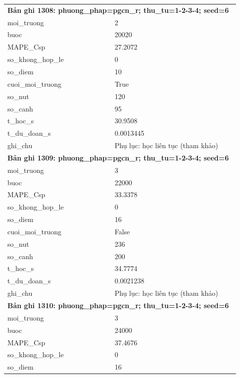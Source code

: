 \begin{longtable}{p{0.43\linewidth}p{0.50\linewidth}}
\midrule
\multicolumn{2}{p{0.95\linewidth}}{\textbf{Bản ghi 1308: phuong\_phap=pgcn\_r; thu\_tu=1-2-3-4; seed=6}} \\
moi\_\allowbreak truong & 2 \\
buoc & 20020 \\
MAPE\_\allowbreak Csp & 27.2072 \\
so\_\allowbreak khong\_\allowbreak hop\_\allowbreak le & 0 \\
so\_\allowbreak diem & 10 \\
cuoi\_\allowbreak moi\_\allowbreak truong & True \\
so\_\allowbreak nut & 120 \\
so\_\allowbreak canh & 95 \\
t\_\allowbreak hoc\_\allowbreak s & 30.9508 \\
t\_\allowbreak du\_\allowbreak doan\_\allowbreak s & 0.0013445 \\
ghi\_\allowbreak chu & Phụ lục: học liên tục (tham khảo) \\
\midrule
\multicolumn{2}{p{0.95\linewidth}}{\textbf{Bản ghi 1309: phuong\_phap=pgcn\_r; thu\_tu=1-2-3-4; seed=6}} \\
moi\_\allowbreak truong & 3 \\
buoc & 22000 \\
MAPE\_\allowbreak Csp & 33.3378 \\
so\_\allowbreak khong\_\allowbreak hop\_\allowbreak le & 0 \\
so\_\allowbreak diem & 16 \\
cuoi\_\allowbreak moi\_\allowbreak truong & False \\
so\_\allowbreak nut & 236 \\
so\_\allowbreak canh & 200 \\
t\_\allowbreak hoc\_\allowbreak s & 34.7774 \\
t\_\allowbreak du\_\allowbreak doan\_\allowbreak s & 0.0021238 \\
ghi\_\allowbreak chu & Phụ lục: học liên tục (tham khảo) \\
\midrule
\multicolumn{2}{p{0.95\linewidth}}{\textbf{Bản ghi 1310: phuong\_phap=pgcn\_r; thu\_tu=1-2-3-4; seed=6}} \\
moi\_\allowbreak truong & 3 \\
buoc & 24000 \\
MAPE\_\allowbreak Csp & 37.4676 \\
so\_\allowbreak khong\_\allowbreak hop\_\allowbreak le & 0 \\
so\_\allowbreak diem & 16 \\

\end{longtable}
